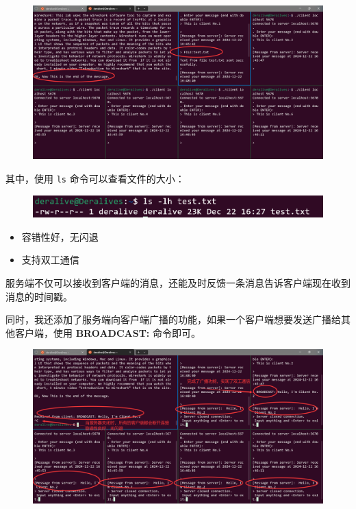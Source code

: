 \documentclass[14pt,a4paper,UTF8,twoside]{article}
\begin{document}
\begin{figure}[H]
    \centering
    \includegraphics[width=0.9\linewidth]{lab7/result2.png}
\end{figure}

其中，使用 \texttt{ls} 命令可以查看文件的大小：

\begin{figure}[H]
    \centering
    \includegraphics[width=0.9\linewidth]{lab7/filesize.png}
\end{figure}

\begin{ctt}
    \begin{itemize}
        \item 容错性好，无闪退 
        \item 支持双工通信
    \end{itemize}
\end{ctt}

服务端不仅可以接收到客户端的消息，还能及时反馈一条消息告诉客户端现在收到消息的时间戳。

同时，我还添加了服务端向客户端广播的功能，如果一个客户端想要发送广播给其他客户端，使用 \textbf{BROADCAST:} 命令即可。

\begin{figure}[H]
    \centering
    \includegraphics[width=0.9\linewidth]{lab7/result3.png}
\end{figure}
\end{document}
